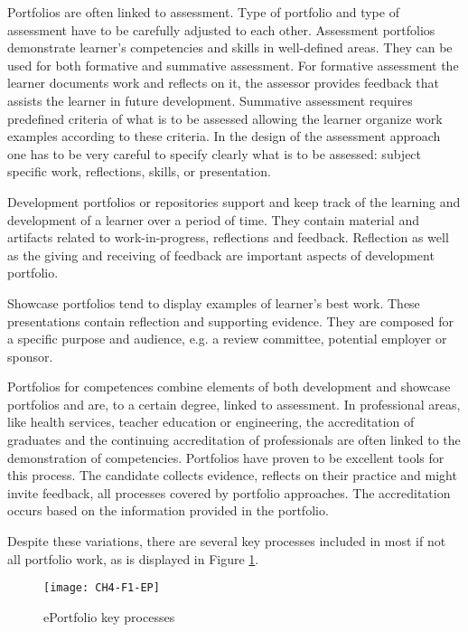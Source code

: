 Portfolios are often linked to assessment. Type of portfolio and type of
assessment have to be carefully adjusted to each other. Assessment portfolios
demonstrate learner's competencies and skills in well-defined areas. They can be
used for both formative and summative assessment. For formative assessment the
learner documents work and reflects on it, the assessor provides feedback that
assists the learner in future development. Summative assessment requires
predefined criteria of what is to be assessed allowing the learner organize work
examples according to these criteria. In the design of the assessment approach
one has to be very careful to specify clearly what is to be assessed: subject
specific work, reflections, \LLLs skills, or presentation.

Development portfolios or repositories support and keep track of the learning
and development of a learner over a period of time. They contain material and
artifacts related to work-in-progress, reflections and feedback. Reflection as
well as the giving and receiving of feedback are important aspects of
development portfolio.

Showcase portfolios tend to display examples of learner's best work. These
presentations contain reflection and supporting evidence. They are composed for
a specific purpose and audience, e.g. a review committee, potential employer or
sponsor.

Portfolios for competences combine elements of both development and showcase
portfolios and are, to a certain degree, linked to assessment. In professional
areas, like health services, teacher education or engineering, the accreditation
of graduates and the continuing accreditation of professionals are often linked
to the demonstration of competencies. Portfolios have proven to be excellent
tools for this process. The candidate collects evidence, reflects on their
practice and might invite feedback, all processes covered by portfolio
approaches. The accreditation occurs based on the information provided in the
portfolio.

Despite these variations, there are several key processes included in most if
not all portfolio work, as is displayed in Figure \ref{fig:ep}.
 
\begin{figure}[htb]
\centering
\texttt{[image: CH4-F1-EP]}
\caption[ePortfolio key processes]{ePortfolio key processes \citep{Malloff2010}}
\label{fig:ep}
\end{figure}

